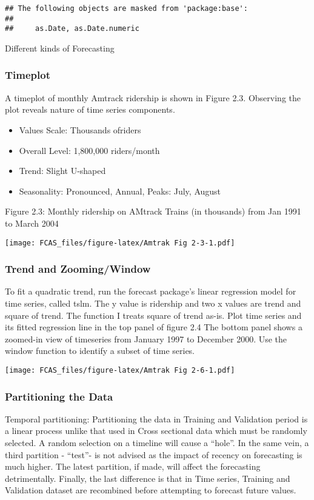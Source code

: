 \documentclass[]{article}
\begin{document}
\begin{verbatim}
## The following objects are masked from 'package:base':
## 
##     as.Date, as.Date.numeric
\end{verbatim}

Different kinds of Forecasting

\subsubsection{Timeplot}\label{timeplot}

A timeplot of monthly Amtrack ridership is shown in Figure 2.3.
Observing the plot reveals nature of time series components.

\begin{itemize}
\item
  Values Scale: Thousands ofriders
\item
  Overall Level: 1,800,000 riders/month
\item
  Trend: Slight U-shaped
\item
  Seasonality: Pronounced, Annual, Peaks: July, August
\end{itemize}

Figure 2.3: Monthly ridership on AMtrack Trains (in thousands) from Jan
1991 to March 2004

\texttt{[image: FCAS\_files/figure-latex/Amtrak Fig 2-3-1.pdf]}

\subsubsection{Trend and Zooming/Window}\label{trend-and-zoomingwindow}

To fit a quadratic trend, run the forecast package's linear regression
model for time series, called tslm. The y value is ridership and two x
values are trend and square of trend. The function I treats square of
trend as-is. Plot time series and its fitted regression line in the top
panel of figure 2.4 The bottom panel shows a zoomed-in view of
timeseries from January 1997 to December 2000. Use the window function
to identify a subset of time series.

\texttt{[image: FCAS\_files/figure-latex/Amtrak Fig 2-6-1.pdf]}

\subsubsection{Partitioning the Data}\label{partitioning-the-data}

Temporal partitioning: Partitioning the data in Training and Validation
period is a linear process unlike that used in Cross sectional data
which must be randomly selected. A random selection on a timeline will
cause a ``hole''. In the same vein, a third partition - ``test''- is not
advised as the impact of recency on forecasting is much higher. The
latest partition, if made, will affect the forecasting detrimentally.
Finally, the last difference is that in Time series, Training and
Validation dataset are recombined before attempting to forecast future
values.
\end{document}
